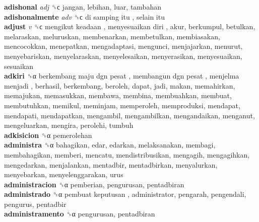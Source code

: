 \textbf{adishonal} \emph{adj}  ␝ϲ  jangan, lebihan, luar, tambahan  \\
\textbf{adishonalmente} \emph{adv}  ␝ϲ   di samping itu ,  selain itu   \\
\textbf{adjust} \emph{v}  ␝ϲ   mengikut keadaan ,  menyesuaikan diri , akur, berkumpul, betulkan, melaraskan, meluruskan, membenarkan, membetulkan, membiasakan, mencocokkan, menepatkan, mengadaptasi, mengunci, menjajarkan, menurut, menyebariskan, menyelaraskan, menyelesaikan, menyerasikan, menyesuaikan, sesuaikan  \\
\textbf{adkiri} ␝α   berkembang maju dgn pesat ,  membangun dgn pesat ,  menjelma menjadi , berhasil, berkembang, beroleh, dapat, jadi, makan, memahirkan, memajukan, memasukkan, membawa, membina, membuahkan, membuat, membutuhkan, memikul, meminjam, memperoleh, memproduksi, mendapat, mendapati, mendapatkan, mengambil, mengambilkan, mengandaikan, menganut, mengeluarkan, mengira, perolehi, tumbuh  \\
\textbf{adkisicion} ␝α  pemerolehan  \\
\textbf{administra} ␝α  bahagikan, edar, edarkan, melaksanakan, membagi, membahagikan, memberi, mencatu, mendistribusikan, mengagih, mengagihkan, mengedarkan, menjalankan, mentadbir, mentadbirkan, menyalurkan, menyebarkan, menyelenggarakan, urus  \\
\textbf{administracion} ␝α  pemberian, pengurusan, pentadbiran  \\
\textbf{administrado} ␝α   pembuat keputusan , administrator, pengarah, pengendali, pengurus, pentadbir  \\
\textbf{administramento} ␝α  pengurusan, pentadbiran  \\
